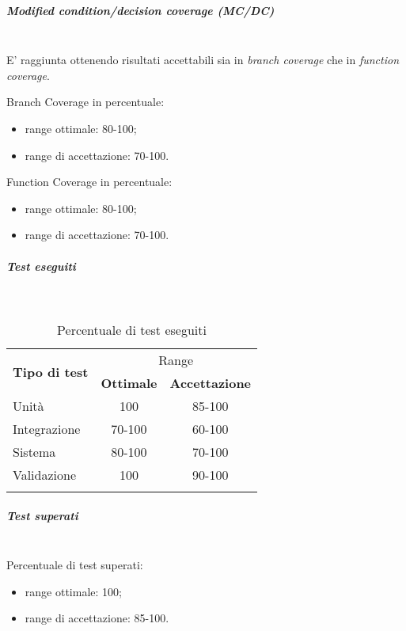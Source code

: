 \subparagraph{Modified condition/decision coverage (MC/DC)}\mbox{}\\
E' raggiunta ottenendo risultati accettabili sia in \textit{branch coverage} che in \textit{function coverage}.

Branch Coverage in percentuale:
\begin{itemize}
	\item range ottimale: 80-100;
	\item range di accettazione: 70-100.
\end{itemize}

Function Coverage in percentuale:
\begin{itemize}
	\item range ottimale: 80-100;
	\item range di accettazione: 70-100.
\end{itemize}

\subparagraph{Test eseguiti}\mbox{}\\
\begin{longtable}[h]{|l|c|c|}
	\hline \multirow{2}{*}{\textbf{Tipo di test}} & \multicolumn{2}{c|}{Range} \\ \cline{2-3}
	& \multicolumn{1}{c|}{\textbf{Ottimale}} & \multicolumn{1}{c|}{\textbf{Accettazione}} \\ \hline
	\endfirsthead
	\hline Unità & 100 & 85-100 \\
	\hline Integrazione & 70-100 & 60-100 \\
	\hline Sistema & 80-100 & 70-100 \\
	\hline Validazione & 100 & 90-100 \\
	\hline
	\caption{Percentuale di test eseguiti}
\end{longtable}

\subparagraph{Test superati}\mbox{}\\
Percentuale di test superati:
\begin{itemize}
	\item range ottimale: 100;
	\item range di accettazione: 85-100.
\end{itemize}

